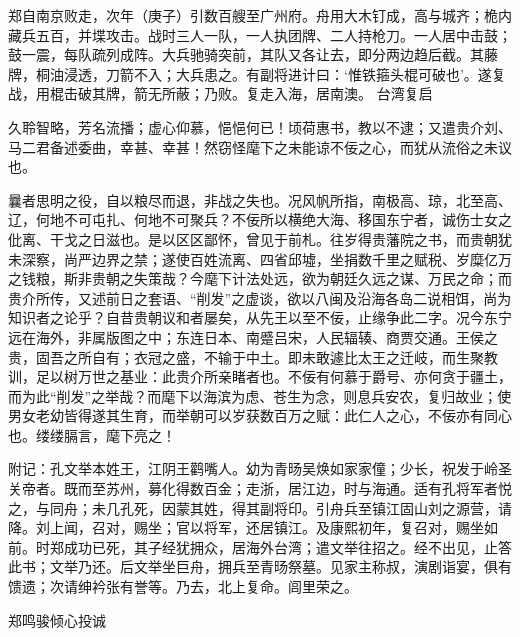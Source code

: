 \documentclass[]{article}
\begin{document}
郑自南京败走，次年（庚子）引数百艘至广州府。舟用大木钉成，高与城齐；桅内藏兵五百，并堞攻击。战时三人一队，一人执团牌、二人持枪刀。一人居中击鼓；鼓一震，每队疏列成阵。大兵驰骑突前，其队又各让去，即分两边趋后截。其藤牌，桐油浸透，刀箭不入；大兵患之。有副将进计曰：`惟铁箍头棍可破也'。遂复战，用棍击破其牌，箭无所蔽；乃败。复走入海，居南澳。
台湾复启

久聆智略，芳名流播；虚心仰慕，悒悒何已！顷荷惠书，教以不逮；又遣贵介刘、马二君备述委曲，幸甚、幸甚！然窃怪麾下之未能谅不佞之心，而犹从流俗之未议也。

曩者思明之役，自以粮尽而退，非战之失也。况风帆所指，南极高、琼，北至高、辽，何地不可屯扎、何地不可聚兵？不佞所以横绝大海、移国东宁者，诚伤士女之仳离、干戈之日滋也。是以区区鄙怀，曾见于前札。往岁得贵藩院之书，而贵朝犹未深察，尚严边界之禁；遂使百姓流离、四省邱墟，坐捐数千里之赋税、岁糜亿万之钱粮，斯非贵朝之失策哉？今麾下计法处远，欲为朝廷久远之谋、万民之命；而贵介所传，又述前日之套语、``削发''之虚谈，欲以八闽及沿海各岛二说相饵，尚为知识者之论乎？自昔贵朝议和者屡矣，从先王以至不佞，止缘争此二字。况今东宁远在海外，非属版图之中；东连日本、南蹙吕宋，人民辐辏、商贾交通。王侯之贵，固吾之所自有；衣冠之盛，不输于中土。即未敢遽比太王之迁岐，而生聚教训，足以树万世之基业：此贵介所亲睹者也。不佞有何慕于爵号、亦何贪于疆土，而为此``削发''之举哉？而麾下以海滨为虑、苍生为念，则息兵安农，复归故业；使男女老幼皆得遂其生育，而举朝可以岁获数百万之赋：此仁人之心，不佞亦有同心也。缕缕膈言，麾下亮之！

附记：孔文举本姓王，江阴王鹳嘴人。幼为青旸吴焕如家家僮；少长，祝发于岭圣关帝者。既而至苏州，募化得数百金；走浙，居江边，时与海通。适有孔将军者悦之，与同舟；未几孔死，因蒙其姓，得其副将印。引舟兵至镇江固山刘之源营，请降。刘上闻，召对，赐坐；官以将军，还居镇江。及康熙初年，复召对，赐坐如前。时郑成功已死，其子经犹拥众，居海外台湾；遣文举往招之。经不出见，止答此书；文举乃还。后文举坐巨舟，拥兵至青旸祭墓。见家主称叔，演剧诣宴，俱有馈遗；次请绅衿张有誉等。乃去，北上复命。闾里荣之。

郑鸣骏倾心投诚
\end{document}
